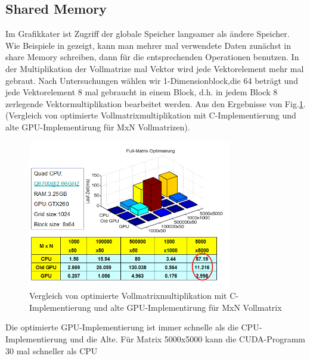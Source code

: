 \subsection{Shared Memory}
Im Grafikkater ist Zugriff der globale Speicher langsamer als ändere Speicher.  Wie Beispiele in \cite{cudapg} gezeigt, kann man mehrer mal verwendete Daten zunächst in share Memory schreiben, dann für die entsprechenden Operationen benutzen. In der Multiplikation der Vollmatrize mal Vektor wird jede Vektorelement mehr mal gebraut. Nach Untersuchungen wählen wir 1-Dimensionblock,die 64 beträgt und jede Vektorelement 8 mal gebraucht in einem Block, d.h. in jedem Block 8 zerlegende Vektormultiplikation bearbeitet werden. Aus den Ergebnisse von Fig.\ref{sharememory}.(Vergleich von optimierte Vollmatrixmultiplikation mit C-Implementierung und alte GPU-Implementirung für MxN Vollmatrizen).
\begin{figure}[htbp]
\includegraphics[width=3.5in]{../xby/pic/sharememory}
\caption{Vergleich von optimierte Vollmatrixmultiplikation mit C-Implementierung und alte GPU-Implementirung für MxN Vollmatrix}
\label{sharememory}
\end{figure}

Die optimierte GPU-Implementierung ist immer schnelle als die CPU-Implementierung  und die Alte. Für Matrix 5000x5000 kann die CUDA-Programm 30 mal schneller als CPU

